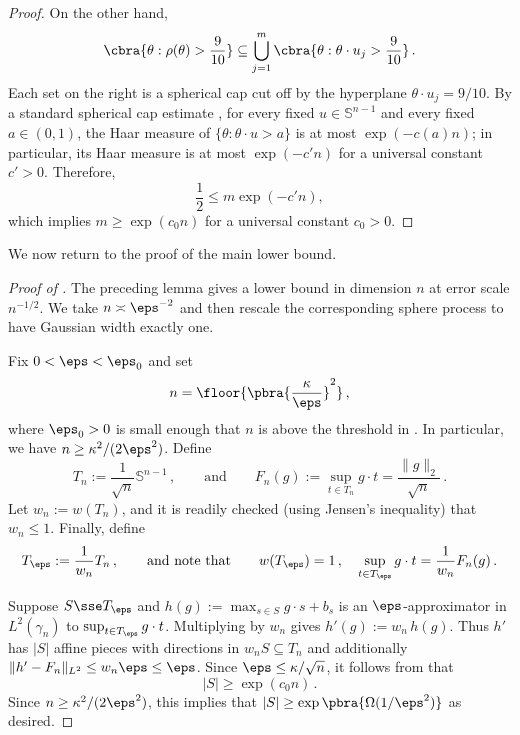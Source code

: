 \documentclass[11pt]{article}
\renewcommand{\S}{\mathbb{S}}
\begin{document}
\begin{proof}
	On the other hand,
	\[
		\cbra{\theta:\rho(\theta)>\frac{9}{10}}
		\subseteq
		\bigcup_{j=1}^m
		\cbra{\theta:\theta\cdot u_j>\frac{9}{10}}\,.
	\]
	Each set on the right is a spherical cap cut off by the hyperplane $\theta\cdot u_j=9/10$. 
	By a standard spherical cap estimate \cite[Lemma~2.2]{ball1997elementary}, for every fixed $u\in\S^{n-1}$ and every fixed $a\in(0,1)$, the Haar measure of $\{\theta:\theta\cdot u>a\}$ is at most $\exp(-c(a)n)$; in particular, its Haar measure is at most $\exp(-c'n)$ for a universal constant $c'>0$.
	Therefore,
	\[
		\frac{1}{2}
		\leq
		m\exp(-c'n),
	\]
	which implies $m\geq \exp(c_0 n)$ for a universal constant $c_0>0$. 
\end{proof}

We now return to the proof of the main lower bound.

\begin{proof}[Proof of ]
	The preceding lemma gives a lower bound in dimension $n$ at error scale
	$n^{-1/2}$.  
	We take $n \asymp \eps^{-2}$ and then rescale the corresponding sphere process to have Gaussian width exactly one. 

	Fix $0<\eps<\eps_0$ and set
	\[
		n=\floor{\pbra{\frac{\kappa}{\eps}}^2}\,,
	\]
	where $\eps_0>0$ is small enough that $n$ is above the threshold in .  
	In particular, we have $n \geq \kappa^2/(2\eps^2)$. 
	Define 
	\[
		T_n:=\frac{1}{\sqrt n}\S^{n-1}\,,
		\qquad\text{and}\qquad 
		F_n(g):=\sup_{t\in T_n}g\cdot t
		=
		\frac{\|g\|_2}{\sqrt n}\,.
	\]
	Let $w_n := w(T_n)$, and it is readily checked (using Jensen's inequality) that $w_n \leq 1$. 
	Finally, define 
	\[
		T_\eps := \frac{1}{w_n} T_n\,,
		\qquad\text{and note that}\qquad 
		w(T_\eps) = 1\,,
		\quad 
		\sup_{t\in T_\eps} g\cdot t = \frac{1}{w_n} F_n(g)\,.
	\]

	Suppose $S \sse T_\eps$ and $h(g) := \max_{s\in S} {g\cdot s + b_s}$ is an $\eps$-approximator in $L^2(\gamma_n)$ to $\sup_{t\in T_\eps} g\cdot t$. 
	Multiplying by $w_n$ gives $h'(g) := w_n\,h(g)$. 
	Thus $h'$ has $|S|$ affine pieces with directions in $w_nS\subseteq T_n$ and additionally $\|h' - F_n\|_{L^2} \leq w_n\eps \leq \eps$. 
	Since $\eps \leq \kappa/\sqrt{n}$, it follows from  that 
	\[
		|S| \geq \exp(c_0n)\,.
	\]
Since $n \geq \kappa^2/(2\eps^2)$, this implies that $|S| \geq \exp\pbra{\Omega(1/\eps^2)}$ as desired. 
\end{proof}
\end{document}
